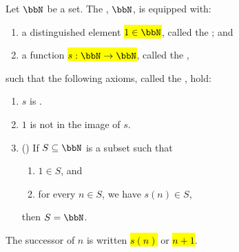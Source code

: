\begin{definition} \label{definition:natural_numbers}
Let $\bbN$ be a set. The , $\bbN$, is equipped with:
\begin{enumerate}
    \item a distinguished element \hl{$1 \in \bbN$}, called the ; and
    \item a function \hl{$s: \bbN \to \bbN$}, called the ,
\end{enumerate}
such that the following axioms, called the , hold:
\begin{enumerate}[resume]
    \item $s$ is .
    \item $1$ is not in the image of $s$.
    \item () If $S \subseteq \bbN$ is a subset such that
    \begin{enumerate}
        \item $1 \in S$, and
        \item for every $n \in S$, we have $s(n) \in S$,
    \end{enumerate}
    then $S = \bbN$.
\end{enumerate}

The successor of $n$ is written \hl{$s(n)$} or \hl{$n+1$}.
\end{definition}
